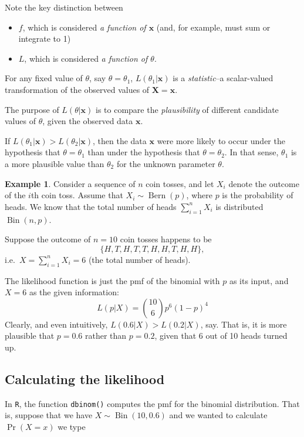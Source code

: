 \documentclass[
]{book}
\providecommand{\tightlist}{%
  \setlength{\itemsep}{0pt}\setlength{\parskip}{0pt}}
\newcommand{\bx}{{\boldsymbol x}}
\newcommand{\bX}{{\boldsymbol X}}
\DeclareMathOperator{\Bin}{Bin}
\DeclareMathOperator{\Bern}{Bern}
\theoremstyle{definition}
\theoremstyle{definition}
\newtheorem{example}{Example}[chapter]
\theoremstyle{definition}
\theoremstyle{definition}
\theoremstyle{remark}
\begin{document}
Note the key distinction between

\begin{itemize}
\tightlist
\item
  \(f\), which is considered \emph{a function of \(\bx\)} (and, for example, must sum or integrate to 1)
\item
  \(L\), which is considered \emph{a function of \(\theta\)}.
\end{itemize}

For any fixed value of \(\theta\), say \(\theta=\theta_1\), \(L(\theta_1|\bx)\) is a \emph{statistic}--a scalar-valued transformation of the observed values of \(\bX=\bx\).

The purpose of \(L(\theta|\bx)\) is to compare the \emph{plausibility} of different candidate values of \(\theta\), given the observed data \(\bx\).

If \(L(\theta_1|\bx) > L(\theta_2|\bx)\), then the data \(\bx\) were more likely to occur under the hypothesis that \(\theta=\theta_1\) than under the hypothesis that \(\theta=\theta_2\). In that sense, \(\theta_1\) is a more plausible value than \(\theta_2\) for the unknown parameter \(\theta\).

\begin{example}
Consider a sequence of \(n\) coin tosses, and let \(X_i\) denote the outcome of the \(i\)th coin toss. Assume that \(X_i\sim\Bern(p)\), where \(p\) is the probability of heads. We know that the total number of heads \(\sum_{i=1}^n X_i\) is distributed \(\Bin(n,p)\).

Suppose the outcome of \(n=10\) coin tosses happens to be
\[\{H, T, H, T, T, H, H, T, H, H \},\]
i.e.~\(X=\sum_{i=1}^n X_i = 6\) (the total number of heads).

The likelihood function is just the pmf of the binomial with \(p\) as its input, and \(X=6\) as the given information:
\[
L(p|X) = {10 \choose 6} p^6(1-p)^{4} 
\]
Clearly, and even intuitively, \(L(0.6|X) > L(0.2|X)\), say.
That is, it is more plausible that \(p=0.6\) rather than \(p=0.2\), given that 6 out of 10 heads turned up.
\end{example}

\hypertarget{calculating-the-likelihood}{%
\subsection{Calculating the likelihood}\label{calculating-the-likelihood}}

In \texttt{R}, the function \texttt{dbinom()} computes the pmf for the binomial distribution. That is, suppose that we have \(X\sim\Bin(10,0.6)\) and we wanted to calculate \(\Pr(X=x)\) we type
\end{document}
